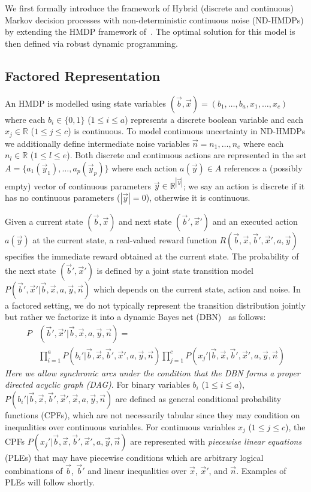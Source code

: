 We first formally introduce the framework of Hybrid (discrete and
continuous) Markov decision processes with non-deterministic
continuous noise (ND-HMDPs) by extending the HMDP framework 
of~\cite{sdp_aaai}. The optimal solution for this model is then defined
via robust dynamic programming.

\subsection{Factored Representation}

An HMDP is modelled using state variables $(\vec{b},\vec{x}) = (
b_1,\ldots,b_a,x_{1},\ldots,x_c )$ where each $b_i \in \{ 0,1 \}$
($1 \leq i \leq a$) represents a discrete boolean variable and
each $x_j \in \mathbb{R}$ ($1 \leq j \leq c$) is continuous.  To model
continuous uncertainty in ND-HMDPs we additionally define intermediate
noise variables $\vec{n} = n_1, \ldots , n_e$ where each
$n_l \in \mathbb{R}$ ($1 \leq l \leq e$).  Both discrete and
continuous actions are represented in the set $A
= \{a_1(\vec{y}_1), \ldots, a_p(\vec{y}_p) \}$ where each action
$a(\vec{y}) \in A$ references a (possibly empty) vector of continuous
parameters $\vec{y} \in \mathbb{R}^{|\vec{y}|}$; we say an action is
discrete if it has no continuous parameters ($|\vec{y}| = 0$), otherwise
it is continuous.

Given a current state $(\vec{b},\vec{x})$ and next state
$(\vec{b}',\vec{x}')$ and an executed action $a(\vec{y})$ 
at the current state, a real-valued reward function $R(\vec{b},\vec{x},\vec{b}',\vec{x}',a,\vec{y})$
specifies the immediate reward obtained at the current state. The probability of the
next state $(\vec{b}',\vec{x}')$ is defined by a joint state
transition model
$P(\vec{b}',\vec{x}'| \vec{b},\vec{x},a,\vec{y},\vec{n})$ which
depends on the current state, action and noise.
In a factored setting, we do not typically represent the transition
distribution jointly but rather we factorize it into a
dynamic Bayes net (DBN)~\cite{dbn} as follows:
{\footnotesize
\begin{align}
P&(\vec{b}',\vec{x}'|\vec{b},\vec{x}, a,\vec{y},\vec{n}) = \nonumber  \\
& \prod_{i=1}^a P(b_i'|\vec{b},\vec{x},\vec{b}',\vec{x}',a,\vec{y},\vec{n}) 
  \prod_{j=1}^c P(x_j'|\vec{b},\vec{x},\vec{b}',\vec{x}',a,\vec{y},\vec{n})
\end{align}
}
\emph{Here we allow synchronic arcs under the condition that the DBN forms
a proper directed acyclic graph (DAG)}.
For binary variables $b_i$ ($1 \leq i \leq a$),
$P(b_i'|\vec{b},\vec{x},\vec{b}',\vec{x}',\vec{x},a,\vec{y},\vec{n})$ are defined as
general conditional probability functions (CPFs), which are not necessarily tabular
since they may condition on inequalities over continuous variables.  For
continuous variables $x_j$ ($1 \leq j \leq c$), the CPFs
$P(x_j'|\vec{b},\vec{x},\vec{b}',\vec{x}',a,\vec{y},\vec{n})$ are represented
with \emph{piecewise linear equations} (PLEs) that may have piecewise 
conditions which are arbitrary logical combinations of
$\vec{b}$, $\vec{b}'$ and linear inequalities over $\vec{x}$, $\vec{x}'$,
and $\vec{n}$.  Examples of PLEs will follow shortly.


